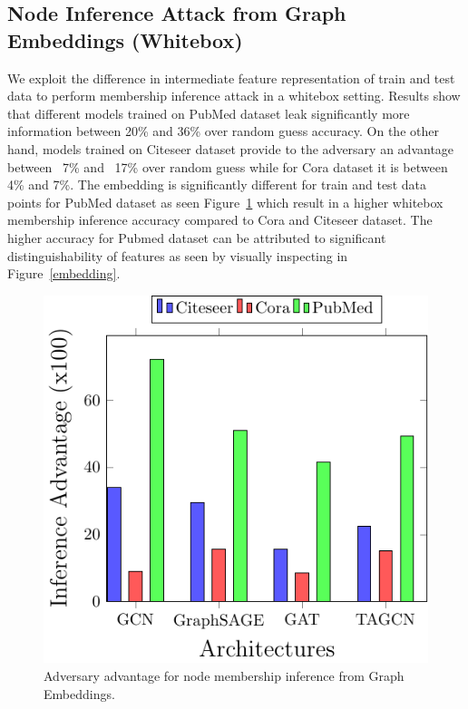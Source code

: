 \subsection{Node Inference Attack from Graph Embeddings (Whitebox)}

We exploit the difference in intermediate feature representation of train and test data to perform membership inference attack in a whitebox setting.
Results show that different models trained on PubMed dataset leak significantly more information between 20\% and 36\% over random guess accuracy.
On the other hand, models trained on Citeseer dataset provide to the adversary an advantage between ~7\% and ~17\% over random guess while for Cora dataset it is between 4\% and 7\%.
The embedding is significantly different for train and test data points for PubMed dataset as seen Figure~\ref{fig:whitebox} which result in a higher whitebox membership inference accuracy compared to Cora and Citeseer dataset.
The higher accuracy for Pubmed dataset can be attributed to significant distinguishability of features as seen by visually inspecting in Figure~\ref{embedding}.

\begin{figure}
  \begin{center}
    \includegraphics[width=\linewidth]{figures/EmbeddingMIA/whiteboxMIA.pdf}
  \end{center}
  \caption{Adversary advantage for node membership inference from Graph Embeddings.}
  \label{fig:whitebox}
\end{figure}



